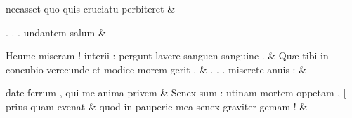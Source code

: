 \documentclass[12pt,onecolumn,twoside,a4paper]{memoir}
\begin{document}
\begin{pairs}
\begin{Leftside}
                              necasset
                              quo
                              quis
                              cruciatu
                              perbiteret \&
                         \stanza {}
                     
                              .
                              .
                              .
                              undantem
                              salum \&
                         \stanza {}
                     
                              Heume
                              miseram
                              !
                              interii
                              :
                              pergunt
                              lavere
                              sanguen
                              sanguine
                              . \&
                         \stanza {}
                     Quæ
                              tibi
                              in
                              concubio
                              verecunde
                              et
                              modice
                              morem
                              gerit
                              . \&
                         \stanza {}.
                              .
                              .
                              miserete
                              anuis
                              : & 
                     
                              date
                              ferrum
                              ,
                              qui
                              me
                              anima
                              privem \&
                         \stanza {}Senex
                              sum
                              :
                              utinam
                              mortem
                              oppetam
                              ,
                              [
                              prius
                              quam
                              evenat & 
                     quod
                              in
                              pauperie
                              mea
                              senex
                              graviter
                              gemam
                              ! \&
                     

\end{Leftside}
\end{pairs}
\end{document}
